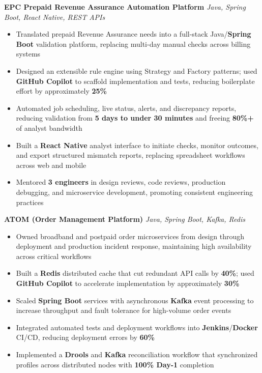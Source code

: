 \documentclass[letterpaper,11pt]{article}
\newcommand{\resumeItem}[1]{
  \item\small{{#1 \vspace{-2pt}}}
}
\newcommand{\resumeItemListStart}{\begin{itemize}}
\newcommand{\resumeItemListEnd}{\end{itemize}\vspace{-5pt}}
\begin{document}
      \vspace{4pt}
      \vspace{4pt}
      \textbf{\small EPC Prepaid Revenue Assurance Automation Platform} \hfill \textit{\small Java, Spring Boot, React Native, REST APIs} \\
      \vspace{-2pt}
      \resumeItemListStart
        \resumeItem{Translated prepaid Revenue Assurance needs into a full-stack Java/\textbf{Spring Boot} validation platform, replacing multi-day manual checks across billing systems}
        \resumeItem{Designed an extensible rule engine using Strategy and Factory patterns; used \textbf{GitHub Copilot} to scaffold implementation and tests, reducing boilerplate effort by approximately \textbf{25\%}}
        \resumeItem{Automated job scheduling, live status, alerts, and discrepancy reports, reducing validation from \textbf{5 days to under 30 minutes} and freeing \textbf{80\%+} of analyst bandwidth}
        \resumeItem{Built a \textbf{React Native} analyst interface to initiate checks, monitor outcomes, and export structured mismatch reports, replacing spreadsheet workflows across web and mobile}
        \resumeItem{Mentored \textbf{3 engineers} in design reviews, code reviews, production debugging, and microservice development, promoting consistent engineering practices}
      \resumeItemListEnd

      \vspace{4pt}
      \textbf{\small ATOM (Order Management Platform)} \hfill \textit{\small Java, Spring Boot, Kafka, Redis} \\
      \vspace{-2pt}
      \resumeItemListStart
        \resumeItem{Owned broadband and postpaid order microservices from design through deployment and production incident response, maintaining high availability across critical workflows}
        \resumeItem{Built a \textbf{Redis} distributed cache that cut redundant API calls by \textbf{40\%}; used \textbf{GitHub Copilot} to accelerate implementation by approximately \textbf{30\%}}
        \resumeItem{Scaled \textbf{Spring Boot} services with asynchronous \textbf{Kafka} event processing to increase throughput and fault tolerance for high-volume order events}
        \resumeItem{Integrated automated tests and deployment workflows into \textbf{Jenkins}/\textbf{Docker} CI/CD, reducing deployment errors by \textbf{60\%}}
        \resumeItem{Implemented a \textbf{Drools} and \textbf{Kafka} reconciliation workflow that synchronized profiles across distributed nodes with \textbf{100\% Day-1} completion}
      \resumeItemListEnd
\end{document}
